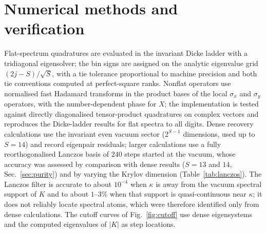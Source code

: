\documentclass[11pt,a4paper]{article}
\begin{document}
\section{Numerical methods and verification}
\label{app:num}
Flat-spectrum quadratures are evaluated in the invariant Dicke ladder with a tridiagonal eigensolver; the bin signs are assigned on the analytic eigenvalue grid $(2j-S)/\sqrt S$, with a tie tolerance proportional to machine precision and both tie conventions computed at perfect-square ranks. Nonflat operators use normalised fast Hadamard transforms in the product bases of the local $\sigma_x$ and $\sigma_y$ operators, with the number-dependent phase for $X$; the implementation is tested against directly diagonalised tensor-product quadratures on complex vectors and reproduces the Dicke-ladder results for flat spectra to all digits. Dense recovery calculations use the invariant even vacuum sector ($2^{S-1}$ dimensions, used up to $S=14$) and record eigenpair residuals; larger calculations use a fully reorthogonalised Lanczos basis of $240$ steps started at the vacuum, whose accuracy was assessed by comparison with dense results ($S=13$ and $14$, Sec.~\ref{sec:purity}) and by varying the Krylov dimension (Table~\ref{tab:lanczos}). The Lanczos filter is accurate to about $10^{-4}$ when $\kappa$ is away from the vacuum spectral support of $K$ and to about $1$--$3\%$ when that support is quasi-continuous near $\kappa$; it does not reliably locate spectral atoms, which were therefore identified only from dense calculations. The cutoff curves of Fig.~\ref{fig:cutoff} use dense eigensystems and the computed eigenvalues of $|K|$ as step locations.
\end{document}
